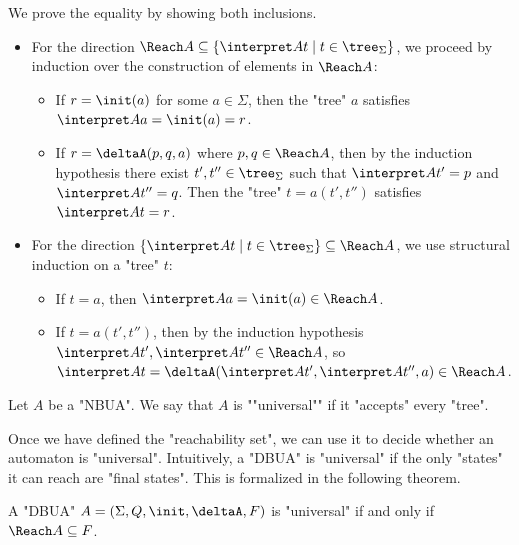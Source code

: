 \documentclass[a4paper,UKenglish,cleveref, autoref, thm-restate]{lipics-v2021}
\begin{document}
\begin{proofI}
	We prove the equality by showing both inclusions.
	\begin{itemize}
		\item For the direction $\Reach A \subseteq \setdef {\interpret A t} {t \in \tree_\Sigma}$, we proceed by induction over the construction of elements in $\Reach A$:
		      \begin{itemize}
			      \item If $r = \init(a)$ for some $a \in \Sigma$, then the "tree" $a$ satisfies $\interpret A a = \init(a) = r$.
			      \item If $r = \deltaA(p, q, a)$ where $p, q \in \Reach A$, then by the induction hypothesis there exist
			            $t', t'' \in \tree_\Sigma$ such that $\interpret A {t'} = p$ and $\interpret A {t''} = q$. Then the "tree" $t = a(t', t'')$ satisfies $\interpret A t = r$.
		      \end{itemize}

		\item For the direction $\setdef {\interpret A t} {t \in \tree_\Sigma} \subseteq \Reach A$, we use structural induction on a "tree" $t$:
		      \begin{itemize}
			      \item If $t = a$, then $\interpret A a = \init(a) \in \Reach A$.
			      \item If $t = a(t', t'')$, then by the induction hypothesis $\interpret A {t'}, \interpret A {t''} \in \Reach A$, so
			            $\interpret A t = \deltaA(\interpret A {t'}, \interpret A {t''}, a) \in \Reach A$.
		      \end{itemize}
	\end{itemize}
\end{proofI}

\begin{definition}
	\AP Let $A$ be a "NBUA". We say that $A$ is ""universal"" if it "accepts" every "tree".
\end{definition}

Once we have defined the "reachability set", we can use it to decide whether an automaton is "universal". Intuitively, a "DBUA" is "universal" if
the only "states" it can reach are "final states". This is formalized in the following theorem.

\begin{theorem}\label{thm:universal-Reach}
	A "DBUA" $A = \DBUA$ is "universal" if and only if $\Reach A \subseteq F$.
\end{theorem}
\end{document}
